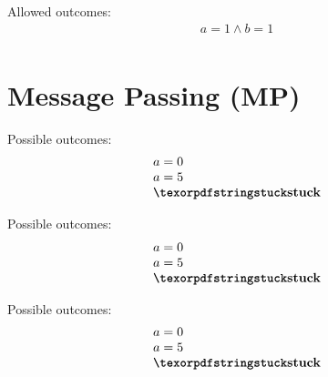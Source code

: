 \begin{minipage}[t]{0.2\linewidth}
Allowed outcomes:\\
\[\begin{array}{l}
a = 1 \land b = 1 \\
\end{array}\]
\end{minipage}
%
\lbJoinTemplate{\acq}{\rlx}{\acq}{\rlx}
\litmusTestEnd

\section{Message Passing (MP)}
\label{app:mp}

\begin{minipage}[t]{0.3\linewidth}
Possible outcomes:\\
\[\begin{array}{l}
a = 0 \\
a = 5 \\
\kw{stuck} \\
\end{array}\]
\end{minipage}
%
\mpTemplate{\rlx}{\na}{\na}{\rlx}{\rlx}{\na}
\litmusTestEnd

\begin{minipage}[t]{0.3\linewidth}
Possible outcomes:\\
\[\begin{array}{l}
a = 0 \\
a = 5 \\
\kw{stuck} \\
\end{array}\]
\end{minipage}
%
\mpTemplate{\rlx}{\na}{\na}{\rel}{\rlx}{\na}
\litmusTestEnd

\begin{minipage}[t]{0.3\linewidth}
Possible outcomes:\\
\[\begin{array}{l}
a = 0 \\
a = 5 \\
\kw{stuck} \\
\end{array}\]
\end{minipage}
%
\mpTemplate{\rlx}{\na}{\na}{\rlx}{\acq}{\na}
\litmusTestEnd

